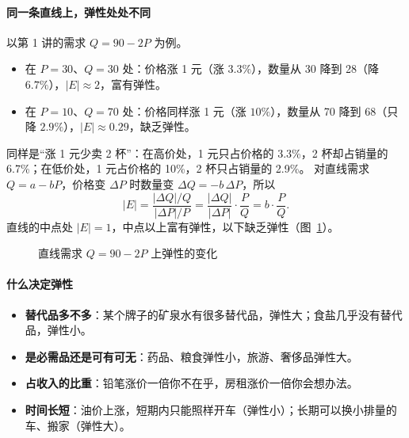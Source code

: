 \paragraph{同一条直线上，弹性处处不同}
以第 1 讲的需求 $Q=90-2P$ 为例。
\begin{itemize}
  \item 在 $P=30$、$Q=30$ 处：价格涨 1 元（涨 $3.3\%$），数量从 30 降到 28（降 $6.7\%$），$|E|\approx2$，富有弹性。
  \item 在 $P=10$、$Q=70$ 处：价格同样涨 1 元（涨 $10\%$），数量从 70 降到 68（只降 $2.9\%$），$|E|\approx0.29$，缺乏弹性。
\end{itemize}
同样是“涨 1 元少卖 2 杯”：在高价处，1 元只占价格的 3.3\%，2 杯却占销量的 6.7\%；在低价处，1 元占价格的 10\%，2 杯只占销量的 2.9\%。
对直线需求 $Q=a-bP$，价格变 $\Delta P$ 时数量变 $\Delta Q=-b\,\Delta P$，所以
\[
  |E|=\frac{|\Delta Q|/Q}{|\Delta P|/P}=\frac{|\Delta Q|}{|\Delta P|}\cdot\frac PQ=b\cdot\frac PQ .
\]
直线的中点处 $|E|=1$，中点以上富有弹性，以下缺乏弹性（图~\ref{fig:es-elastic-line}）。

\begin{figure}[!htbp]
\centering
{}
\caption{直线需求 $Q=90-2P$ 上弹性的变化}
\label{fig:es-elastic-line}
\end{figure}

\paragraph{什么决定弹性}
\begin{itemize}
  \item \textbf{替代品多不多}：某个牌子的矿泉水有很多替代品，弹性大；食盐几乎没有替代品，弹性小。
  \item \textbf{是必需品还是可有可无}：药品、粮食弹性小，旅游、奢侈品弹性大。
  \item \textbf{占收入的比重}：铅笔涨价一倍你不在乎，房租涨价一倍你会想办法。
  \item \textbf{时间长短}：油价上涨，短期内只能照样开车（弹性小）；长期可以换小排量的车、搬家（弹性大）。
\end{itemize}

